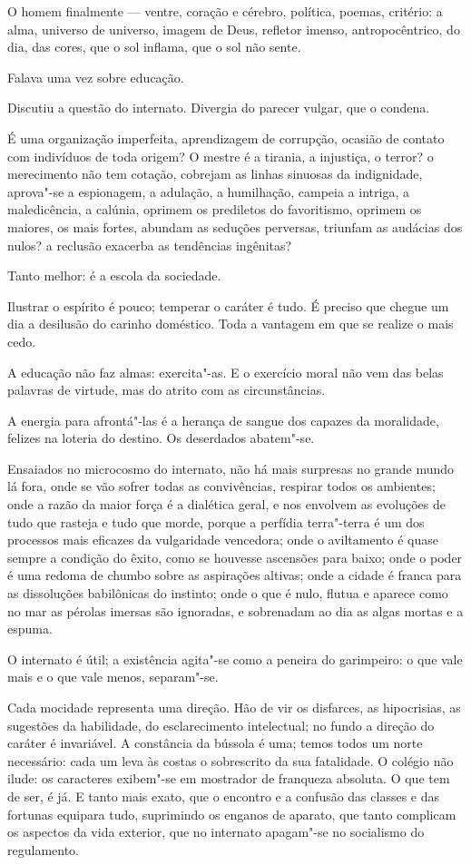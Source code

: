 O homem finalmente --- ventre, coração e
cérebro, política, poemas, critério: a alma, universo de universo,
imagem de Deus, refletor imenso, antropocêntrico, do dia, das cores,
que o sol inflama, que o sol não sente. 

Falava uma vez sobre educação.

Discutiu a questão do internato. Divergia do parecer vulgar, que o
condena.

É uma organização imperfeita, aprendizagem de corrupção,
ocasião de contato com indivíduos de toda origem? O mestre é a tirania,
a injustiça, o terror? o merecimento não tem cotação, cobrejam as
linhas sinuosas da indignidade, aprova"-se a espionagem, a adulação, a
humilhação, campeia a intriga, a maledicência, a calúnia, oprimem os
prediletos do favoritismo, oprimem os maiores, os mais fortes, abundam
as seduções perversas, triunfam as audácias dos nulos? a reclusão
exacerba as tendências ingênitas? 

Tanto melhor: é a escola da sociedade. 

Ilustrar o espírito é pouco; temperar o caráter é tudo. É
preciso que chegue um dia a desilusão do carinho doméstico. Toda a
vantagem em que se realize o mais cedo. 

A educação não faz almas:
exercita"-as. E o exercício moral não vem das belas palavras de
virtude, mas do atrito com as circunstâncias. 

A energia para afrontá"-las é a herança de sangue dos capazes da moralidade, 
felizes na loteria do destino. Os deserdados abatem"-se. 

Ensaiados no microcosmo do internato, não há mais surpresas no grande mundo lá fora,
onde se vão sofrer todas as convivências, respirar todos os ambientes;
onde a razão da maior força é a dialética geral, e nos envolvem as
evoluções de tudo que rasteja e tudo que morde, porque a perfídia
terra"-terra é um dos processos mais eficazes da vulgaridade vencedora;
onde o aviltamento é quase sempre a condição do êxito, como se houvesse
ascensões para baixo; onde o poder é uma redoma de chumbo sobre as
aspirações altivas; onde a cidade é franca para as dissoluções
babilônicas do instinto; onde o que é nulo, flutua e aparece como no
mar as pérolas imersas são ignoradas, e sobrenadam ao dia as algas
mortas e a espuma. 

O internato é útil; a existência agita"-se como a
peneira do garimpeiro: o que vale mais e o que vale menos,
separam"-se. 

Cada mocidade representa uma direção. Hão de vir os
disfarces, as hipocrisias, as sugestões da habilidade, do
esclarecimento intelectual; no fundo a direção do caráter é invariável.
A constância da bússola é uma; temos todos um norte necessário: cada um
leva às costas o sobrescrito da sua fatalidade. O colégio não ilude: os
caracteres exibem"-se em mostrador de franqueza absoluta. O que tem de
ser, é já. E tanto mais exato, que o encontro e a confusão das classes
e das fortunas equipara tudo, suprimindo os enganos de aparato, que
tanto complicam os aspectos da vida exterior, que no internato
apagam"-se no socialismo do regulamento. 

